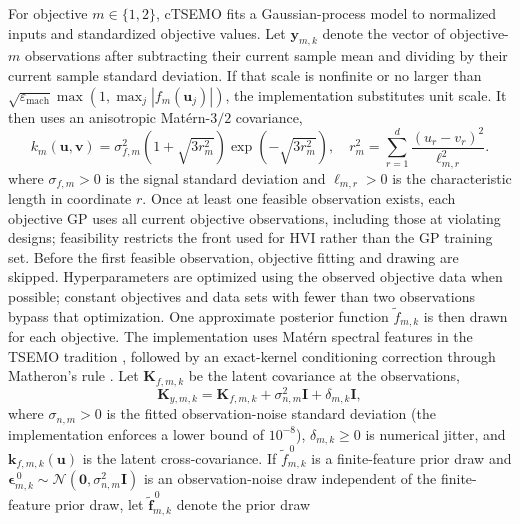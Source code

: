 \documentclass[twoside]{article}
\begin{document}
For objective \(m\in\{1,2\}\), cTSEMO fits a Gaussian-process model to
normalized inputs and standardized objective values. Let
\(\mathbf y_{m,k}\) denote the vector of objective-\(m\) observations after
subtracting their current sample mean and dividing by their current sample
standard deviation. If that scale is nonfinite or no larger than
\(\sqrt{\varepsilon_{\mathrm{mach}}}\max(1,\max_j|f_m(\mathbf u_j)|)\), the
implementation substitutes unit scale. It then uses an anisotropic Mat\'ern-\(3/2\)
covariance,
\begin{equation}
  k_m(\mathbf{u},\mathbf{v})=
  \sigma_{f,m}^2
  \left(1+\sqrt{3r_m^2}\right)
  \exp\!\left(-\sqrt{3r_m^2}\right),
  \quad
  r_m^2=\sum_{r=1}^{d}
  \frac{(u_r-v_r)^2}{\ell_{m,r}^2}.
  \label{eq:objective-kernel}
\end{equation}
where \(\sigma_{f,m}>0\) is the signal standard deviation and
\(\ell_{m,r}>0\) is the characteristic length in coordinate \(r\).
Once at least one feasible observation exists, each objective GP uses all
current objective observations, including those at violating designs;
feasibility restricts the front used for HVI rather than the GP training set.
Before the first feasible observation, objective fitting and drawing are
skipped. Hyperparameters are optimized using the observed objective data when
possible; constant objectives and data sets with fewer than two observations
bypass that optimization. One
approximate posterior function \(\widetilde f_{m,k}\) is then drawn for each
objective. The implementation uses Mat\'ern spectral features in the TSEMO
tradition \cite{bradford2018tsemo}, followed by an exact-kernel conditioning
correction through Matheron's rule \cite{wilson2020pathwise}. Let
\(\mathbf{K}_{f,m,k}\) be the latent covariance at the observations,
\begin{equation}
  \mathbf{K}_{y,m,k}
  =
  \mathbf{K}_{f,m,k}
  +\sigma_{n,m}^2\mathbf{I}
  +\delta_{m,k}\mathbf{I},
  \label{eq:objective-observation-covariance}
\end{equation}
where \(\sigma_{n,m}>0\) is the fitted observation-noise standard deviation
(the implementation enforces a lower bound of \(10^{-8}\)),
\(\delta_{m,k}\geq0\) is numerical jitter, and
\(\mathbf{k}_{f,m,k}(\mathbf{u})\) is the latent cross-covariance. If
\(\widetilde f_{m,k}^{\,0}\) is a finite-feature prior draw and
\(\boldsymbol{\epsilon}_{m,k}^{\,0}\sim
\mathcal{N}(\mathbf{0},\sigma_{n,m}^2\mathbf{I})\) is an observation-noise
draw independent of the finite-feature prior draw, let
\(\widetilde{\mathbf f}_{m,k}^{\,0}\) denote the prior draw
\end{document}

